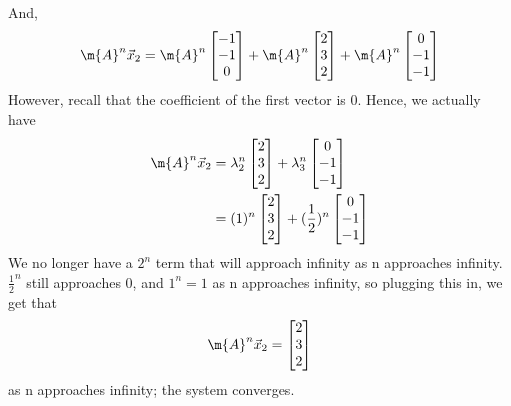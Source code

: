 \begin{enumerate}[label=(\alph*)]
{    And, 
    \begin{align*}
    \m{A}^n\vec{x}_2 &= \m{A}^n \begin{bmatrix}-1 \\ -1 \\ 0\end{bmatrix} + \m{A}^n \begin{bmatrix}2 \\ 3 \\ 2\end{bmatrix} + \m{A}^n \begin{bmatrix}0 \\ -1 \\ -1\end{bmatrix} \\
    \end{align*}
    However, recall that the coefficient of the first vector is 0. Hence, we actually have
    \begin{align*}
    \m{A}^n\vec{x}_2 &= \lambda_2^n \begin{bmatrix}2 \\ 3 \\ 2\end{bmatrix} + \lambda_3^n \begin{bmatrix}0 \\ -1 \\ -1\end{bmatrix} \\
    &= (1)^n \begin{bmatrix}2 \\ 3 \\ 2\end{bmatrix} + (\frac{1}{2})^n \begin{bmatrix}0 \\ -1 \\ -1\end{bmatrix} \\
   \end{align*}
  We no longer have a $2^n$ term that will approach infinity as n approaches infinity. $\frac{1}{2}^n$ still approaches 0, and $1^n = 1$ as n approaches infinity, so plugging this in, we get that $$\m{A}^n\vec{x}_2 = \begin{bmatrix}2 \\ 3 \\ 2\end{bmatrix}$$ as n approaches infinity; the system converges.
    }
    

\end{enumerate}
